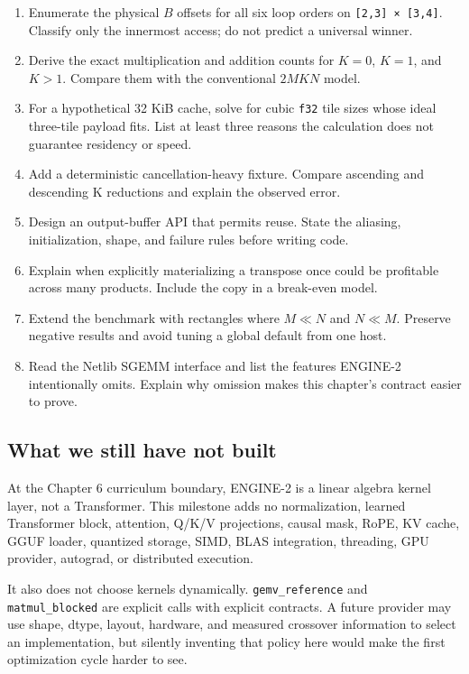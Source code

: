 \documentclass[
  10pt,
]{article}
\providecommand{\tightlist}{%
  \setlength{\itemsep}{0pt}\setlength{\parskip}{0pt}}
\begin{document}
\begin{enumerate}
\def\labelenumi{\arabic{enumi}.}
\tightlist
\item
  Enumerate the physical \(B\) offsets for all six loop orders on
  \texttt{{[}2,3{]}\ ×\ {[}3,4{]}}. Classify only the innermost access;
  do not predict a universal winner.
\item
  Derive the exact multiplication and addition counts for \(K=0\),
  \(K=1\), and \(K>1\). Compare them with the conventional \(2MKN\)
  model.
\item
  For a hypothetical 32 KiB cache, solve for cubic \texttt{f32} tile
  sizes whose ideal three-tile payload fits. List at least three reasons
  the calculation does not guarantee residency or speed.
\item
  Add a deterministic cancellation-heavy fixture. Compare ascending and
  descending K reductions and explain the observed error.
\item
  Design an output-buffer API that permits reuse. State the aliasing,
  initialization, shape, and failure rules before writing code.
\item
  Explain when explicitly materializing a transpose once could be
  profitable across many products. Include the copy in a break-even
  model.
\item
  Extend the benchmark with rectangles where \(M\ll N\) and \(N\ll M\).
  Preserve negative results and avoid tuning a global default from one
  host.
\item
  Read the Netlib SGEMM interface and list the features ENGINE-2
  intentionally omits. Explain why omission makes this chapter's
  contract easier to prove.
\end{enumerate}

\subsection{What we still have not
built}\label{what-we-still-have-not-built-1}

At the Chapter 6 curriculum boundary, ENGINE-2 is a linear algebra
kernel layer, not a Transformer. This milestone adds no normalization,
learned Transformer block, attention, Q/K/V projections, causal mask,
RoPE, KV cache, GGUF loader, quantized storage, SIMD, BLAS integration,
threading, GPU provider, autograd, or distributed execution.

It also does not choose kernels dynamically. \texttt{gemv\_reference}
and \texttt{matmul\_blocked} are explicit calls with explicit contracts.
A future provider may use shape, dtype, layout, hardware, and measured
crossover information to select an implementation, but silently
inventing that policy here would make the first optimization cycle
harder to see.
\end{document}
